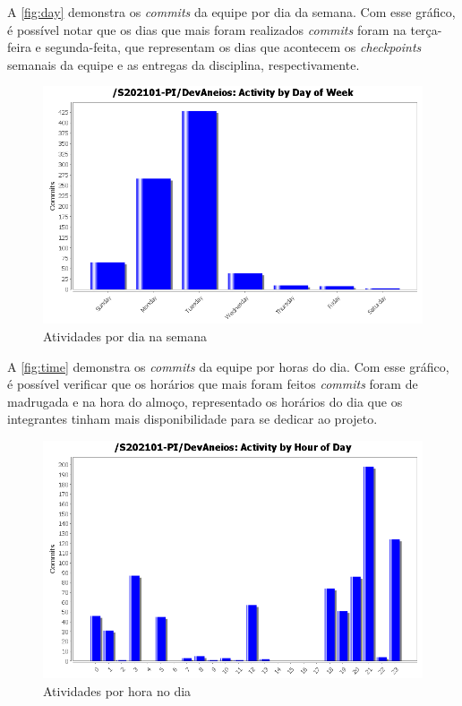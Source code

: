 A \autoref{fig:day} demonstra os \textit{commits} da equipe por dia da semana. Com esse gráfico, é possível notar que os dias que mais foram realizados \textit{commits} foram na terça-feira e segunda-feita, que representam os dias que acontecem os \textit{checkpoints} semanais da equipe e as entregas da disciplina, respectivamente.

\begin{figure}[htb]
    \centering
	\includegraphics[width=16cm]{imagens/activity_day.png}
	\caption{\label{fig:day} Atividades por dia na semana}
\end{figure}
\FloatBarrier

A \autoref{fig:time} demonstra os \textit{commits} da equipe por horas do dia. Com esse gráfico, é possível verificar que os horários que mais foram feitos \textit{commits} foram de madrugada e na hora do almoço, representado os horários do dia que os integrantes tinham mais disponibilidade para se dedicar ao projeto.

\begin{figure}[htb]
    \centering
	\includegraphics[width=16cm]{imagens/activity_time.png}
	\caption{\label{fig:time} Atividades por hora no dia}
\end{figure}
\FloatBarrier

